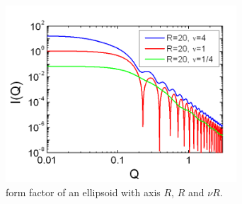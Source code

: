 \begin{figure}[htb]
\begin{center}
\includegraphics[width=0.768\textwidth]{../images/form_factor/Ellipsoid/ellipsoid_ii.png}
\end{center}
\caption{form factor of an ellipsoid with axis $R$, $R$ and $\nu
R$.} \label{fig:I_ellipsoid_ii}
\end{figure}



\clearpage
